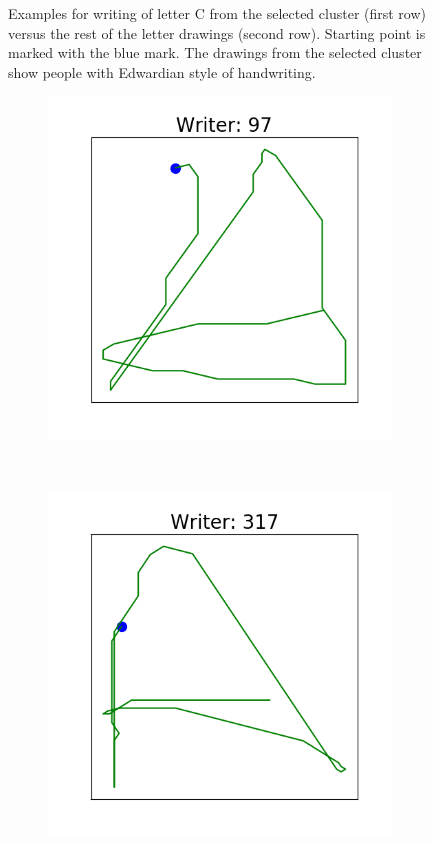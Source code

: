 \begin{figure}[!htbp]
      \caption{Examples for writing of letter C from the selected cluster (first row) versus the rest of the letter drawings (second row). Starting point is marked with the blue mark. The drawings from the selected cluster show people with Edwardian style of handwriting.}
      \label{fig:examples_c}
  \end{figure}

  \begin{figure}[!htbp]
      \centering
      \begin{subfigure}{0.45\textwidth}
          \includegraphics[scale=0.50]{images/framework/A_97.png}
      \end{subfigure}
      ~
      \begin{subfigure}{0.45\textwidth}
          \includegraphics[scale=0.50]{images/framework/A_317.png}

\end{subfigure}
\end{figure}
